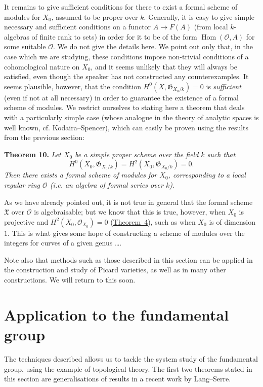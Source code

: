 \documentclass{article}
\newenvironment{itenv}[1]
  {\phantomsection\par\medskip\noindent\textbf{#1.}\itshape}
  {\medskip}
\newcommand{\scr}[1]{{\mathscr{#1}}}
\renewcommand{\cal}[1]{{\mathcal{#1}}}
\newcommand{\fk}{\mathfrak}
\DeclareMathOperator{\Hom}{Hom}
\newcommand{\oldpage}[1]{\marginpar{\footnotesize$\Big\vert$ \textit{p.~#1}}}
\begin{document}
\oldpage{182-17}
It remains to give sufficient conditions for there to exist a formal scheme of modules for $X_0$, assumed to be proper over $k$.
Generally, it is easy to give simple necessary and sufficient conditions on a functor $A\to F(A)$ (from local $k$-algebras of finite rank to sets) in order for it to be of the form $\Hom(\cal{O},A)$ for some suitable $\cal{O}$.
We do not give the details here.
We point out only that, in the case which we are studying, these conditions impose non-trivial conditions of a cohomological nature on $X_0$, and it seems unlikely that they will always be satisfied, even though the speaker has not constructed any counterexamples.
It seems plausible, however, that the condition $H^0(X,\fk{G}_{X_0/k})=0$ is \emph{sufficient} (even if not at all necessary) in order to guarantee the existence of a formal scheme of modules.
We restrict ourselves to stating here a theorem that deals with a particularly simple case (whose analogue in the theory of analytic spaces is well known, cf. Kodaira--Spencer), which can easily be proven using the results from the previous section:

\begin{itenv}{Theorem 10}
\label{theorem10}
  Let $X_0$ be a simple proper scheme over the field $k$ such that
  \[
    H^0(X_0,\fk{G}_{X_0/k}) = H^2(X_0,\fk{G}_{X_0/k}) = 0.
  \]
  Then there exists a formal scheme of modules for $X_0$, corresponding to a local regular ring $\cal{O}$ (i.e. an algebra of formal series over $k$).
\end{itenv}

As we have already pointed out, it is not true in general that the formal scheme $\fk{X}$ over $\cal{O}$ is algebraisable;
but we know that this is true, however, when $X_0$ is projective and $H^2(X_0,\scr{O}_{X_0})=0$ (\hyperref[theorem4]{Theorem~4}), such as when $X_0$ is of dimension~$1$.
This is what gives some hope of constructing a scheme of modules over the integers for curves of a given genus \ldots.

Note also that methods such as those described in this section can be applied in the construction and study of Picard varieties, as well as in many other constructions.
We will return to this soon.


\section{Application to the fundamental group}
\label{section8}

The techniques described allows us to tackle the system study of the fundamental group, using the example of topological theory.
The first two theorems stated in this section are generalisations of results in a recent work by Lang--Serre.
\end{document}
